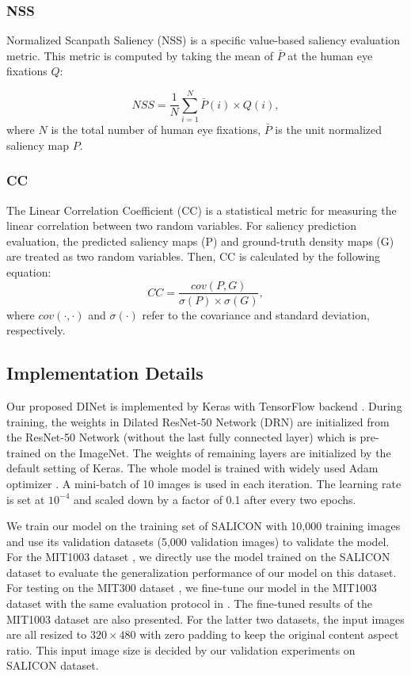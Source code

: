 \subsubsection{NSS}
Normalized Scanpath Saliency (NSS) is a specific value-based saliency evaluation metric. This metric is computed by taking the mean of $\bar{P}$ at the human eye fixations $Q$:

\begin{equation}
NSS = \frac{1}{N}\sum_{i=1}^N \bar{P}(i)\times Q(i),
\end{equation}
where $N$ is the total number of human eye fixations,  $\bar{P}$ is the unit normalized saliency map $P$. 

\subsubsection{CC}
The Linear Correlation Coefficient (CC) is a statistical metric for measuring the linear correlation between two random variables. For saliency prediction evaluation, the predicted saliency maps (P) and ground-truth density maps (G) are treated as two random variables. Then, CC is calculated by the following equation:
\begin{equation}
\label{eq:loss2}
CC = \frac{cov(P,G)}{\sigma(P)\times\sigma(G)},
\end{equation}
where $cov(\cdot,\cdot) $ and $\sigma(\cdot)$ refer to the covariance and standard deviation, respectively. 







\subsection{Implementation Details} 
Our proposed DINet is implemented by Keras with TensorFlow backend \cite{chollet2015keras,abadi2016tensorflow}. During training, the weights in Dilated ResNet-50 Network (DRN) are initialized from the ResNet-50 Network (without the last fully connected layer) which is pre-trained on the ImageNet. The weights of remaining layers are initialized by the default setting of Keras. The whole model is trained with widely used Adam optimizer \cite{kingma2014adam}. A mini-batch of 10 images is used in each iteration. The learning rate is set at $10^{-4}$ and scaled down by a factor of 0.1 after every two epochs. 


We train our model on the training set of SALICON \cite{jiang2015salicon} with 10,000 training images and use its validation datasets (5,000 validation images) to validate the model. For the MIT1003 dataset \cite{judd2009learning}, we directly use the model trained on the SALICON dataset to evaluate the generalization performance of our model on this dataset. For testing on the MIT300 dataset \cite{Judd_2012}, we fine-tune our model in the MIT1003 dataset with the same evaluation protocol in \cite{cornia2016predicting,liu2016deep}. The fine-tuned results of the MIT1003 dataset are also presented. For the latter two datasets, the input images are all resized to $320 \times 480$ with zero padding to keep the original content aspect ratio. This input image size is decided by our validation experiments on SALICON dataset.

